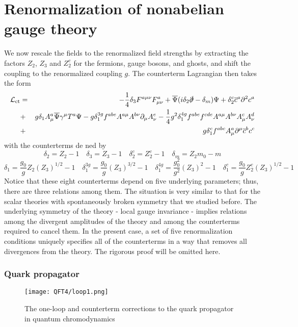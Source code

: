 \section{Renormalization of nonabelian gauge theory}
We now rescale the fields to the renormalized field strengths by extracting the factors $Z_2$, $Z_3$ and $Z_2^c$ for the fermions, gauge bosons, and ghosts, and shift the coupling to the renormalized coupling $g$. The counterterm Lagrangian then takes the form
\begin{eqnarray}
\mathcal{L}_{\rm ct} &=& -\frac{1}{4}\delta_3 F^{a\mu\nu}F^a_{\mu\nu} + \overline{\Psi}(i\delta_2\slashed{\partial}-\delta_m)\Psi + \delta_2^c \overline{c}^a \partial^2 c^a \nonumber \\
&+& g\delta_1 A^a_{\mu}\overline{\Psi}\gamma^{\mu}T^a\Psi -g\delta_{1}^{3g} f^{abe}A^{a\mu}A^{b\nu}\partial_{\mu}A^e_{\nu} - \frac{1}{4}g^2\delta_1^{4g} f^{abe}f^{cde}A^{a\mu}A^{b\nu}A^c_{\mu}A^d_{\nu} \nonumber \\
&+& g\delta_1^c f^{abc}A^a_{\mu}\partial^{\mu}\overline{c}^b c^c \nonumber
\end{eqnarray}
with the counterterms de ned by
\[\delta_2 = Z_2 - 1 \quad \delta_3 = Z_3 - 1 \quad \delta_2^c = Z_2^c - 1 \quad \delta_m = Z_2m_0-m\]
\[\delta_1 = \frac{g_0}{g}Z_2(Z_3)^{1/2} - 1 \quad \delta_1^{3g} = \frac{g_0}{g}(Z_3)^{3/2} - 1 \quad \delta_1^{4g} = \frac{g_0^2}{g^2}(Z_3)^2 - 1 \quad \delta_1^c = \frac{g_0}{g}Z_2^c(Z_3)^{1/2} - 1\]
Notice that these eight counterterms depend on five underlying parameters; thus, there are three relations among them. The situation is very similar to that for the scalar theories with spontaneously broken symmetry that we studied before. 
The underlying symmetry of the theory - local gauge invariance - implies relations among the divergent amplitudes of the theory and among the counterterms required to cancel them. 
In the present case, a set of five renormalization conditions uniquely specifies all of the counterterms in a way that removes all divergences from the theory.
The rigorous proof will be omitted here.

\subsubsection{Quark propagator}
\begin{figure}[!h]
	\centering
	\texttt{[image: QFT4/loop1.png]}
	\caption{The one-loop and counterterm corrections to the quark propagator in quantum chromodynamics}
\end{figure}

